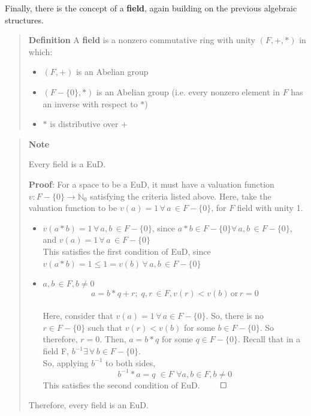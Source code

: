 \documentclass[letterpaper,12pt,titlepage,oneside,final]{book}
\newenvironment{defn}{\begin{quote}%
  \textbf{Definition }%
  \quad
}{%
\end{quote}%
}
\newenvironment{note}{\begin{quote}%
  \textbf{Note }%
  \quad
}{%
\end{quote}%
}
\begin{document}
Finally, there is the concept of a \textbf{field}, again building on the previous algebraic structures. 

\begin{defn}\label{defn: Field}
  A \textbf{field} is a nonzero commutative ring with unity ${(F, +, *)}$ in which:
  \begin{itemize}
    \item ${(F, +)}$ is an Abelian group
    \item ${(F - \{0\}, *)}$ is an Abelian group (i.e. every nonzero element in ${F}$ has an inverse with respect to ${*}$)
    \item ${*}$ is distributive over ${+}$
  \end{itemize}
\end{defn}

\begin{note}
  Every field is a EuD.

  \textbf{Proof}: For a space to be a EuD, it must have a valuation function ${v : F - \{0\} \rightarrow \mathbb{N}_0}$ satisfying the criteria listed above.
  Here, take the valuation function to be ${v(a) = 1 \, \forall \, a \, \in F - \{0\}}$, for ${F}$ field with unity 1.    
  \begin{itemize}
    \item ${v(a * b) = 1 \, \forall \, a, b \, \in F - \{0\}}$, since ${a * b \in F - \{0\} \forall \, a, b \, \in F - \{0\}}$, and ${v(a) = 1 \, \forall \, a \, \in F - \{0\}}$ \\ This satisfies the first condition of EuD, since ${v(a * b) = 1 \leq 1 = v(b) \, \forall \, a, b \, \in F - \{0\}}$
    \item ${a, b \, \in F, b \neq 0}$ \begin{equation*} a = b * q + r; \; q, r \, \in F, v(r) < v(b) \, \text{or} \, r = 0 \end{equation*} \\ Here, consider that ${v(a) = 1 \, \forall \, a \in F - \{0\}}$.  So, there is no ${r \in F - \{0\}}$ such that ${v(r) < v(b)}$ for some ${b \in F - \{0\}}$.  So therefore, ${r = 0}$.  Then, ${a = b*q}$ for some ${q \in F - \{0\}}$.  Recall that in a field F, ${b^{-1} \exists \, \forall \, b \in F - \{0\}}$. \\ So, applying ${b^{-1}}$ to both sides, \begin{equation*} b^{-1} * a = q \; \in F \,\, \forall a, b \in F, b \neq 0 \end{equation*}  This satisfies the second condition of EuD. ${\qed}$
  \end{itemize} 

  Therefore, every field is an EuD.
\end{note}
\end{document}
